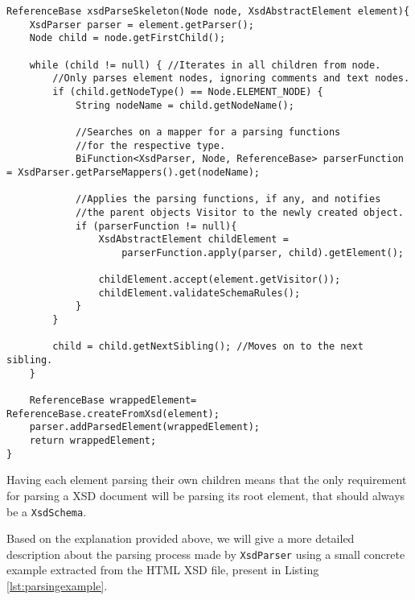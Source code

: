 \begin{minipage}{\linewidth}
\begin{lstlisting}[caption={XsdParseSkeleton Function - Parsing Children From a Node},captionpos=b,label={lst:skeletonfunction}]
ReferenceBase xsdParseSkeleton(Node node, XsdAbstractElement element){
    XsdParser parser = element.getParser();
    Node child = node.getFirstChild();

    while (child != null) { //Iterates in all children from node.
        //Only parses element nodes, ignoring comments and text nodes.
        if (child.getNodeType() == Node.ELEMENT_NODE) { 
            String nodeName = child.getNodeName();

            //Searches on a mapper for a parsing functions 
            //for the respective type.
            BiFunction<XsdParser, Node, ReferenceBase> parserFunction = XsdParser.getParseMappers().get(nodeName);

            //Applies the parsing functions, if any, and notifies 
            //the parent objects Visitor to the newly created object.
            if (parserFunction != null){
                XsdAbstractElement childElement =
                	parserFunction.apply(parser, child).getElement();
                
                childElement.accept(element.getVisitor());
                childElement.validateSchemaRules();
            }
        }

        child = child.getNextSibling(); //Moves on to the next sibling.
    }

    ReferenceBase wrappedElement= ReferenceBase.createFromXsd(element);
    parser.addParsedElement(wrappedElement);
    return wrappedElement;
}
\end{lstlisting}
\end{minipage}

\noindent
Having each element parsing their own children means that the only requirement for parsing a \ac{XSD} document will be parsing its root element, that should always be a \texttt{XsdSchema}. 

\noindent
Based on the explanation provided above, we will give a more detailed description about the parsing process made by \texttt{XsdParser} using a small concrete example extracted from the \ac{HTML} \ac{XSD} file, present in Listing \ref{lst:parsingexample}.

\bigskip


